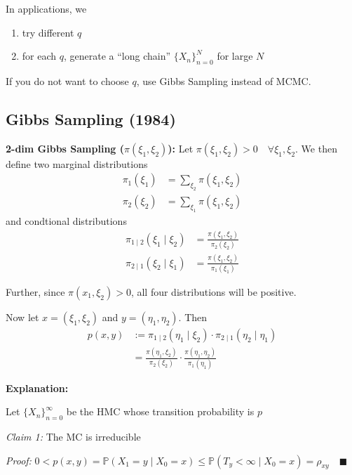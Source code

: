 \documentclass[12pt]{article}
\renewcommand{\P}{\mathbb{P}}
\newcommand{\qed}{\quad \blacksquare}
\begin{document}
        In applications, we 
        \begin{enumerate}
            \item try different $q$
            \item for each $q$, generate a ``long chain'' $\{X_n\}_{n=0}^N$ for large $N$
        \end{enumerate}

        If you do not want to choose $q$, use Gibbs Sampling instead of MCMC. 

    \subsection{Gibbs Sampling (1984)}
        \textbf{2-dim Gibbs Sampling ($\pi(\xi_1, \xi_2)$):}
            Let $\pi(\xi_1, \xi_2) > 0 \quad \forall \xi_1, \xi_2$. We then define two marginal distributions
            \begin{align*}
                \pi_1(\xi_1) &= \sum_{\xi_2} \pi(\xi_1, \xi_2)\\
                \pi_2(\xi_2) &= \sum_{\xi_1} \pi(\xi_1, \xi_2)
            \end{align*}
            and condtional distributions
            \begin{align*}
                \pi_{1 \; | \; 2}(\xi_1 \; | \; \xi_2) &= \frac{\pi(\xi_1, \xi_2)}{\pi_2(\xi_2)} \\
                \pi_{2 \; | \; 1}(\xi_2 \; | \; \xi_1) &= \frac{\pi(\xi_1, \xi_2)}{\pi_1(\xi_1)} 
            \end{align*}

            Further, since $\pi(x_1, \xi_2) >0$, all four distributions will be positive.
            
            Now let $x = (\xi_1, \xi_2)$ and $y = (\eta_1, \eta_2)$. Then 
            \begin{align*}
                p(x, y) &:= \pi_{1\; | \;2}(\eta_1 \; | \; \xi_2) \cdot \pi_{2 \; | \; 1}(\eta_2 \; | \; \eta_1)\\
                &= \frac{\pi(\eta_1, \xi_2)}{\pi_2(\xi_2)} \cdot \frac{\pi(\eta_1, \eta_2)}{\pi_1(\eta_1)}
            \end{align*}


        \textbf{Explanation:}
        
        Let $\{X_n\}_{n=0}^\infty$ be the HMC whose transition probability is $p$

        \emph{Claim 1:} The MC is irreducible

        \emph{Proof:} $0 < p(x, y) = \P(X_1 = y \; | \; X_0 = x) \leq \P(T_y < \infty \; | \; X_0 = x) = \rho_{xy} \qed$
\end{document}
